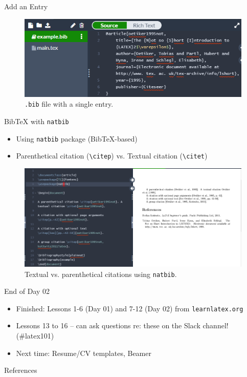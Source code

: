 \documentclass{beamer}
\begin{document}
{  \begin{frame}{Add an Entry}
    \begin{figure}
      \includegraphics[width=0.8\linewidth]{day02-03B-entry.png}
      \caption{\texttt{.bib} file with a single entry.}
      \label{fig:day02-03B}
    \end{figure}
  \end{frame}

  \begin{frame}{BibTeX with \texttt{natbib}}
    \begin{itemize}
      \item Using \texttt{natbib} package (BibTeX-based)
      \item Parenthetical citation (\texttt{\textbackslash citep}) vs. Textual citation (\texttt{\textbackslash citet})
    \end{itemize}
    \begin{figure}
      \includegraphics[width=0.8\linewidth]{day02-03C-natbib.png}
      \caption{Textual vs. parenthetical citations using \texttt{natbib}.}
      \label{fig:day02-03C}
    \end{figure}
  \end{frame}

\begin{frame}{End of Day 02}
  \begin{itemize}
    \item Finished: Lessons 1-6 (Day 01) and 7-12 (Day 02) from \texttt{learnlatex.org}
    \item Lessons 13 to 16 -- can ask questions re: these on the Slack channel! (\#latex101)
    \item Next time: Resume/CV templates, Beamer
  \end{itemize}
\end{frame}

\begin{frame}{References}
  
  
\end{frame}

} %
\end{document}
